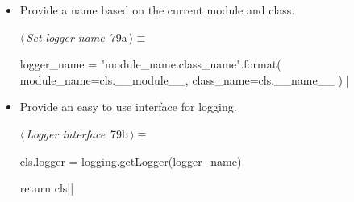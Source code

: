 \documentclass[%
    a4paper,    %
    justified,  %
    nobib,      %
    openany     %
]{tufte-book}
\begin{document}
\begin{itemize}
  \item Provide a name based on the current module and class.
    \begin{flushleft} \small
\begin{minipage}{\linewidth}\label{scrap57}\raggedright\small
{} $\langle\,${\itshape Set logger name}\nobreak\ {\footnotesize {79a}}$\,\rangle\equiv$
\vspace{-1ex}
\begin{pythoncode}
      logger_name = "{module_name}.{class_name}".format(
    module_name=cls.__module__,
    class_name=cls.__name__
)|\NWsep|
\end{pythoncode}
\vspace{1.5ex}
\footnotesize
{}
\end{minipage}\vspace{4ex}
\end{flushleft}
\item Provide an easy to use interface for logging.
    \begin{flushleft} \small
\begin{minipage}{\linewidth}\label{scrap58}\raggedright\small
{} $\langle\,${\itshape Logger interface}\nobreak\ {\footnotesize {79b}}$\,\rangle\equiv$
\vspace{-1ex}
\begin{pythoncode}
      cls.logger = logging.getLogger(logger_name)

return cls|\NWsep|
\end{pythoncode}
\vspace{1.5ex}
\footnotesize
{}
\end{minipage}\vspace{4ex}
\end{flushleft}
\end{itemize}
\end{document}
